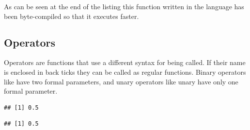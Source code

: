 \documentclass[krantz2]{krantz}\usepackage{knitr}%
\begin{document}
As can be seen at the end of the listing this function written in the \Rlang language has been byte-compiled so that it executes faster.

\subsection{Operators}

Operators are functions that use a different syntax for being called. If their name is enclosed in back ticks they can be called as regular functions. Binary operators like \code{+} have two formal parameters, and unary operators like unary \code{-} have only one formal parameter.

\begin{knitrout}\footnotesize
{}\color{fgcolor}\begin{kframe}
\begin{alltt}
 \hlopt{/} 
\end{alltt}
\begin{verbatim}
## [1] 0.5
\end{verbatim}
\begin{alltt}
\hlstd{(} \hlstd{,} \hlstd{)}
\end{alltt}
\begin{verbatim}
## [1] 0.5
\end{verbatim}
\end{kframe}
\end{knitrout}
\end{document}
